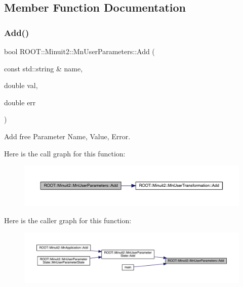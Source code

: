 \subsection{Member Function Documentation}
\mbox{\label{classROOT_1_1Minuit2_1_1MnUserParameters_a95405d43b783605dba2ead1ba3125ebc}} 
\subsubsection{\texorpdfstring{Add()}{Add()}\hspace{0.1cm}{\footnotesize\ttfamily [1/6]}}
{\footnotesize\ttfamily bool R\+O\+O\+T\+::\+Minuit2\+::\+Mn\+User\+Parameters\+::\+Add (\begin{DoxyParamCaption}\item[{const std\+::string \&}]{name,  }\item[{double}]{val,  }\item[{double}]{err }\end{DoxyParamCaption})}



Add free Parameter Name, Value, Error. 

Here is the call graph for this function\+:\nopagebreak
\begin{figure}[H]
\begin{center}
\leavevmode
\includegraphics[width=350pt]{d6/d10/classROOT_1_1Minuit2_1_1MnUserParameters_a95405d43b783605dba2ead1ba3125ebc_cgraph}
\end{center}
\end{figure}
Here is the caller graph for this function\+:\nopagebreak
\begin{figure}[H]
\begin{center}
\leavevmode
\includegraphics[width=350pt]{d6/d10/classROOT_1_1Minuit2_1_1MnUserParameters_a95405d43b783605dba2ead1ba3125ebc_icgraph}
\end{center}
\end{figure}
\mbox{\label{classROOT_1_1Minuit2_1_1MnUserParameters_a95405d43b783605dba2ead1ba3125ebc}} 
